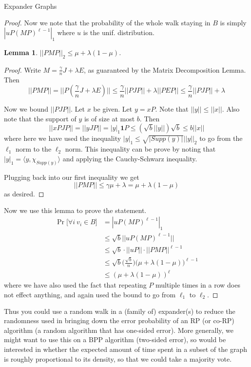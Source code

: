 \documentclass{article}
\newtheorem{lemma}{Lemma}
\begin{document}
\begin{section}{Expander Graphs}
\begin{proof}
    Now we note that the probability of the whole walk staying in $B$ is simply $|uP(MP)^{\ell-1}|_1$ where $u$ is the unif. distribution.

    \begin{lemma}
      $||PMP||_2 \leq \mu + \lambda(1-\mu)$.
    \end{lemma}
    \begin{proof}
      Write $M = \frac{\gamma}{n}J + \lambda E$, as guaranteed by the Matrix Decomposition Lemma.
      Then
      $$
      ||PMP|| = ||P(\frac{\gamma}{n}J + \lambda E)|| \leq \frac{\gamma}{n}||PJP|| + \lambda ||PEP|| \leq \frac{\gamma}{n}||PJP|| + \lambda
      $$

      Now we bound $||PJP||$.
      Let $x$ be given.
      Let $y = xP$.
      Note that $||y|| \leq ||x||$.
      Also note that the support of $y$ is of size at most $b$.
      Then
      $$
      ||xPJP|| = ||yJP|| = |y|_1 \mathbf 1 P \leq (\sqrt{b}||y||)\sqrt{b} \leq b||x||
      $$
      where here we have used the inequality $|y|_1 \leq \sqrt{|Supp(y)|}||y||_2$ to go from the $\ell_1$ norm to the $\ell_2$ norm.
      This inequality can be prove by noting that $|y|_1 = \langle y, \chi_{Supp(y)}\rangle$ and applying the Cauchy-Schwarz inequality.

      Plugging back into our first inequality we get
      $$
      ||PMP|| \leq \gamma\mu + \lambda = \mu + \lambda(1-\mu)
      $$
      as desired.
    \end{proof}

    Now we use this lemma to prove the statement.
    \begin{equation}
      \begin{aligned}
	\Pr\big[\forall i~v_i \in B\big] &= |uP(MP)^{\ell-1}|_1\\
	~&\leq \sqrt{b} ||uP(MP)^{\ell-1}||\\
	~&\leq \sqrt{b} \cdot ||uP|| \cdot ||PMP||^{\ell-1}\\
	~&\leq \sqrt{b}\big(\frac{\sqrt{b}}{n}\big)\big(\mu + \lambda(1-\mu)\big)^{\ell-1}\\
	~&\leq (\mu + \lambda(1-\mu))^\ell
      \end{aligned}
    \end{equation}
    where we have also used the fact that repeating $P$ multiple times in a row does not effect anything, and again used the bound to go from $\ell_1$ to $\ell_2$.
  \end{proof}

  Thus you could use a random walk in a (family of) expander(s) to reduce the randomness used in bringing down the error probability of an RP (or co-RP) algorithm (a random algorithm that has one-sided error).
  More generally, we might want to use this on a BPP algorithm (two-sided error), so would be interested in whether the expected amount of time spent in a subset of the graph is roughly
  proportional to its density, so that we could take a majority vote.


\end{section}
\end{document}
